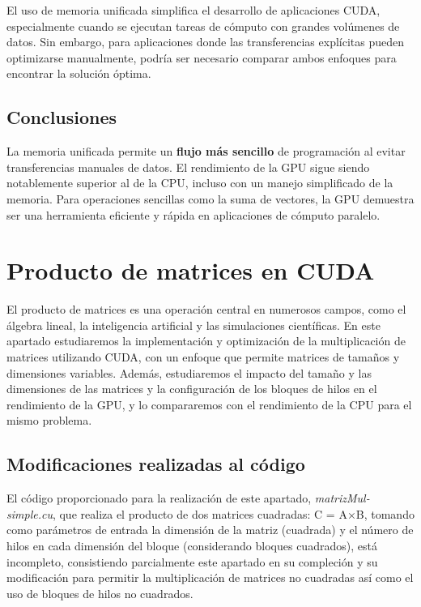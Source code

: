\documentclass[twocolumn,a4paper,12pt]{article}
\begin{document}
El uso de memoria unificada simplifica el desarrollo de aplicaciones CUDA, especialmente cuando se ejecutan tareas de cómputo con grandes volúmenes de datos. Sin embargo, para aplicaciones donde las transferencias explícitas pueden optimizarse manualmente, podría ser necesario comparar ambos enfoques para encontrar la solución óptima.

\subsection{Conclusiones}

La memoria unificada permite un \textbf{flujo más sencillo} de programación al evitar transferencias manuales de datos. El rendimiento de la GPU sigue siendo notablemente superior al de la CPU, incluso con un manejo simplificado de la memoria. Para operaciones sencillas como la suma de vectores, la GPU demuestra ser una herramienta eficiente y rápida en aplicaciones de cómputo paralelo.

\section{Producto de matrices en CUDA}

El producto de matrices es una operación central en numerosos campos, como el álgebra lineal, la inteligencia artificial y las simulaciones científicas. En este apartado estudiaremos la implementación y optimización de la multiplicación de matrices utilizando CUDA, con un enfoque que permite matrices de tamaños y dimensiones variables. Además, estudiaremos el impacto del tamaño y las dimensiones de las matrices y la configuración de los bloques de hilos en el rendimiento de la GPU, y lo compararemos con el rendimiento de la CPU para el mismo problema.

\subsection{Modificaciones realizadas al código}

El código proporcionado para la realización de este apartado, \textit{matrizMul-simple.cu}, que realiza el producto de dos matrices cuadradas: C = A×B, tomando como parámetros de entrada la dimensión de la matriz (cuadrada) y el número de hilos en cada dimensión del bloque (considerando bloques cuadrados), está incompleto, consistiendo parcialmente este apartado en su compleción y su modificación para permitir la multiplicación de matrices no cuadradas así como el uso de bloques de hilos no cuadrados. 
\end{document}
